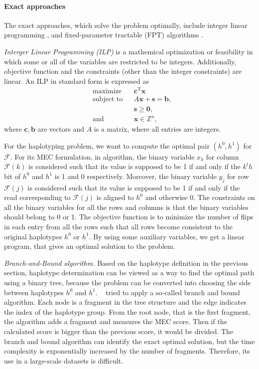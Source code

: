 \paragraph{Exact approaches} The exact approaches, which solve the problem optimally, include integer linear programming \citep{Fouilhoux2012,Chen2013}, and fixed-parameter tractable (FPT) algorithms \citep{He2010,Patterson2015,Pirola2015}.

\textit{Interger Linear Programming (ILP)} is a mathemical optimization or feasibility in which some or all of the variables are restricted to be integers. Additionally, objective function and the constraints (other than the integer constraints) are linear.
An ILP in standard form is expressed as
\[{\begin{aligned}&{\text{maximize}}&&\mathbf {c} ^{\mathrm {T} }\mathbf {x} \\&{\text{subject to}}&&A\mathbf {x} +\mathbf {s} =\mathbf {b} ,\\&&&\mathbf {s} \geq \mathbf {0} ,\\&{\text{and}}&&\mathbf {x} \in \mathbb {Z} ^{n},\end{aligned}}\]
where $\displaystyle \mathbf {c} ,\mathbf {b} $  are vectors and $\displaystyle A $ is a matrix, where all entries are integers.

For the haplotyping problem, we want to compute the optimal pair $(h^0,h^1)$ for $\mathcal{F}$. For its MEC formulation, in \citep{Chen2013} algorithm, the binary variable $x_k$ for column $\mathcal{F}(k)$ is considered such that its value is supposed to be 1 if and only if the $k^th$ bit of $h^0$ and $h^1$ is 1 and 0 respectively.
Moreover, the binary variable $y_j$ for row $\mathcal{F}(j)$ is considered such that its value is supposed to be 1 if and only if the read corresponding to $\mathcal{F}(j)$ is aligned to $h^0$ and otherwise 0.
The constraints on all the binary variables for all the rows and columns is that the binary variables should belong to 0 or 1.
The objective function is to minimize the number of flips in each entry from all the rows such that all rows become consistent to the original haplotypes $h^0$ or $h^1$. By using some auxiliary variables, we get a linear program, that gives an optimal solution to the problem.

\textit{Branch-and-Bound algorithm.}
Based on the haplotype definition in the previous section, haplotype determination can be viewed as a way to find the optimal path using a binary tree, because the problem can
be converted into choosing the side between haplotypes $h^0$ and $h^1$. ~\cite{li2005parsimonious} tried to apply a so-called branch
and bound algorithm. Each node is a fragment in the tree
structure and the edge indicates the index of the haplotype
group. From the root node, that is the first fragment, the
algorithm adds a fragment and measures the MEC score.
Then if the calculated score is bigger than the previous
score, it would be divided. The branch and bound algorithm
can identify the exact optimal solution, but the time
complexity is exponentially increased by the number of
fragments. Therefore, its use in a large-scale datasets is
difficult.

